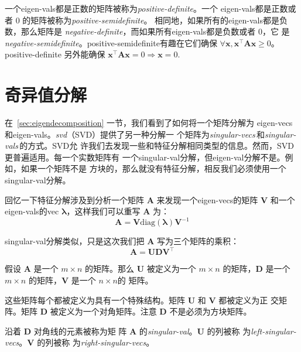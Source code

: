 一个\gls*{eigen-vals}都是正数的矩阵被称为\emph{\gls{positive-definite}}。一个
\gls*{eigen-vals}都是正数或者 $0$ 的矩阵被称为\emph{\gls{positive-semidefinite}}。
相同地，如果所有的\gls*{eigen-vals}都是负数，那么矩阵是
\emph{\gls{negative-definite}}，而如果所有\gls*{eigen-vals}都是负数或者 $0$，它
是\emph{\gls{negative-semidefinite}}。\gls*{positive-semidefinite}有趣在它们确保
$\forall\pmb{x}, \pmb{x}^{\top}\pmb{A}\pmb{x} \geq 0$。\gls*{positive-definite}
另外能确保 $\pmb{x}^{\top}\pmb{A}\pmb{x} = 0 \Rightarrow \pmb{x} = 0$.

\section{奇异值分解}
\label{sec:singular_value_decomposition}

在~\ref{sec:eigendecomposition} 一节，我们看到了如何将一个矩阵分解为
\gls*{eigen-vecs} 和\gls*{eigen-vals}。\emph{\gls{svd}}（SVD）提供了另一种分解一
个矩阵为\emph{\gls{singular-vecs}}\,和\emph{\gls{singular-vals}}\,的方式。SVD允
许我们去发现一些和特征分解相同类型的信息。然而，SVD 更普遍适用。每一个实数矩阵有
一个\gls*{singular-val}分解，但\gls*{eigen-val}分解不是。例如，如果一个矩阵不是
方块的，那么就没有特征分解，相反我们必须使用一个\gls*{singular-val}分解。

回忆一下特征分解涉及到分析一个矩阵 $\pmb{A}$ 来发现一个\gls*{eigen-vecs}的矩阵
$\pmb{V}$ 和一个\gls*{eigen-vals}的\gls*{vec} $\pmb{\lambda}$，这样我们可以重写
$\pmb{A}$ 为：
\begin{equation}
  \pmb{A} = \pmb{V}\mathrm{diag}(\pmb{\lambda})\pmb{V}^{-1}
\end{equation}

\gls*{singular-val}分解类似，只是这次我们把 $\pmb{A}$ 写为三个矩阵的乘积：
\begin{equation}
  \pmb{A} = \pmb{U}\pmb{D}\pmb{V}^{\top}
\end{equation}

假设 $\pmb{A}$ 是一个 $m \times n$ 的矩阵。那么 $\pmb{U}$ 被定义为一个 $m \times
n$ 的矩阵，$\pmb{D}$ 是一个 $m \times n$ 的矩阵，$\pmb{V}$ 是一个 $n \times n$的
矩阵。

这些矩阵每个都被定义为具有一个特殊结构。矩阵 $\pmb{U}$ 和 $\pmb{V}$ 都被定义为正
交矩阵。矩阵 $\pmb{D}$ 被定义为一个对角矩阵。注意 $\pmb{D}$ 不是必须为方块矩阵。

沿着 $\pmb{D}$ 对角线的元素被称为矩
阵 $\pmb{A}$ 的\emph{\gls{singular-val}}。$\pmb{U}$ 的列被称
为\emph{\gls{left-singular-vecs}}。$\pmb{V}$ 的列被称
为\emph{\gls{right-singular-vecs}}。

